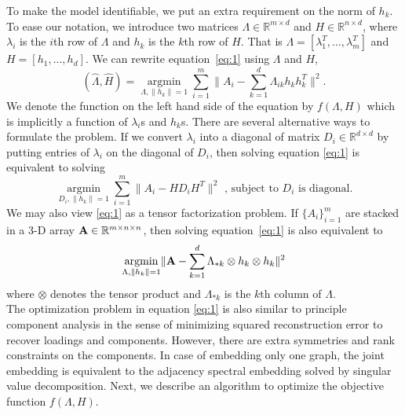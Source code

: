 \documentclass[10pt,journal,compsoc]{IEEEtran}
\begin{document}
\noindent  To make the model identifiable, we put an extra requirement on the norm of $h_k$. To ease our notation, we introduce two matrices $\Lambda \in \mathbb{R}^{m \times d}$ and $H\in \mathbb{R}^{n \times d}$, where $\lambda_i$ is the $i$th row of $\Lambda$ and $h_k$ is the $k$th row of $H$. That is $\Lambda=[\lambda_1^T,...,\lambda_m^T]$ and $H=[h_1,...,h_d]$. We can rewrite equation~\eqref{eq:1} using $\Lambda$ and $H$,
\begin{equation*}
(\hat{\Lambda},\hat{H}) = \underset{\Lambda,\|h_k\|=1}{\operatorname{argmin}} \sum\limits_{i=1}^{m} \| A_i- \sum\limits_{k=1}^{d} \Lambda_{ik} h_k h_k^T \|  ^2.  
\end{equation*}
 We denote the function on the left hand side of the equation by $f(\Lambda,H)$ which is implicitly a function of $\lambda_i$s and $h_k$s. There are several alternative ways to formulate the problem. If we convert $\lambda_i$ into a diagonal of matrix $D_i \in \mathbb{R}^{d \times d}$ by putting entries of $\lambda_i$ on the diagonal of $D_i$, then solving equation \eqref{eq:1} is equivalent to solving
\[  \underset{D_i,\|h_k\|=1}{\operatorname{argmin}} \sum\limits_{i=1}^{m} \| A_i- H D_i H^T \|  ^2  \text{ , subject to $D_i$ is diagonal.}\]
We may also view \eqref{eq:1} as a tensor factorization problem. If $\{A_i\}_{i=1}^m$ are stacked in a 3-D array ${\bf A} \in \mathbb{R}^{m\times n \times n}$, then solving equation~\eqref{eq:1} is also equivalent to
\[  \underset{\Lambda,\|h_k\|=1}{\operatorname{argmin}}  \| {\bf A} - \sum\limits_{k=1}^{d} \Lambda_{*k} \otimes h_k \otimes h_k\|  ^2  \]
where $\otimes$ denotes the tensor product and $\Lambda_{*k}$ is the $k$th column of $\Lambda$. \\

\noindent The optimization problem in equation \eqref{eq:1} is also similar to principle component analysis in the sense of minimizing squared reconstruction error to recover loadings and components. However, there are extra symmetries and rank constraints on the components. In case of embedding only one graph, the joint embedding is equivalent to the adjacency spectral embedding solved by singular value decomposition. Next, we describe an algorithm to optimize the objective function $f(\Lambda,H)$.  
\end{document}
